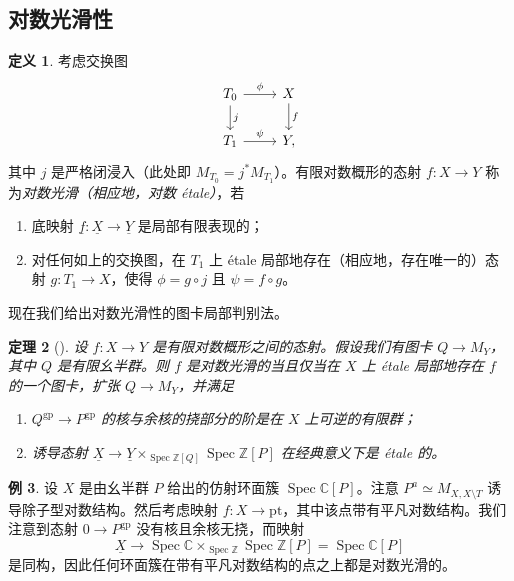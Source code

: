 \documentclass{amsart}
\newtheorem{thm}{定理}[section]
\theoremstyle{definition}
\newtheorem{defn}[thm]{定义}
\newtheorem{exm}[thm]{例}
\theoremstyle{remark}
\theoremstyle{plain}
\theoremstyle{definition}
\theoremstyle{remark}
\newcommand{\C}{\mathbb{C}}
\newcommand{\Z}{\mathbb{Z}}
\newcommand{\mr}[1]{\mathrm{#1}}
\newcommand{\ul}[1]{\underline{#1}}
\newcommand{\1}{\mathbf{1}}
\newcommand{\2}{\mathbf{2}}
\newcommand{\3}{\mathbf{3}}
\DeclareMathOperator{\Spec}{Spec}
\begin{document}
\subsection{对数光滑性}%
\label{sub:Log smoothness}

\begin{defn}
    考虑交换图
    \begin{equation*}
    \begin{tikzcd}
        T_0 \ar{r}{\phi} \ar{d}{j} & X \ar{d}{f} \\
        T_1 \ar{r}{\psi} & Y,
    \end{tikzcd}
    \end{equation*}
    其中 \(j\) 是严格闭浸入（此处即 \(M_{T_0} = j^* M_{T_1}\)）。有限对数概形的态射 \(f \colon X \to Y\) 称为\textit{对数光滑（相应地，对数 \'etale）}，若
    \begin{enumerate}
        \item 底映射 \(\ul{f} \colon \ul{X} \to \ul{Y}\) 是局部有限表现的；
        \item 对任何如上的交换图，在 \(T_1\) 上 \'etale 局部地存在（相应地，存在唯一的）态射 \(g \colon T_1 \to X\)，使得 \(\phi = g \circ j\) 且 \(\psi = f \circ g\)。
    \end{enumerate}
\end{defn}

现在我们给出对数光滑性的图卡局部判别法。

\begin{thm}[{\cite[Theorem~3.5]{Kato1989}}]
    设 \(f \colon X \to Y\) 是有限对数概形之间的态射。假设我们有图卡 \(Q \to M_Y\)，其中 \(Q\) 是有限幺半群。则 \(f\) 是对数光滑的当且仅当在 \(X\) 上 \'etale 局部地存在 \(f\) 的一个图卡，扩张 \(Q \to M_Y\)，并满足
    \begin{enumerate}
        \item \(Q^{\mr{gp}} \to P^{\mr{gp}}\) 的核与余核的挠部分的阶是在 \(X\) 上可逆的有限群；
        \item 诱导态射 \(\ul{X} \to \ul{Y} \times_{\Spec \Z[Q]} \Spec \Z[P]\) 在经典意义下是 \'etale 的。
    \end{enumerate}
\end{thm}

\begin{exm}
    设 \(X\) 是由幺半群 \(P\) 给出的仿射环面簇 \(\Spec \C[P]\)。注意 \(P^a \simeq M_{X, X \setminus T}\) 诱导除子型对数结构。然后考虑映射 \(f \colon X \to \mr{pt}\)，其中该点带有平凡对数结构。我们注意到态射 \(0 \to P^{\mr{gp}}\) 没有核且余核无挠，而映射
    \[ \ul{X} \to \Spec \C \times_{\Spec \Z} \Spec \Z[P] = \Spec \C[P] \]
    是同构，因此任何环面簇在带有平凡对数结构的点之上都是对数光滑的。
\end{exm}
\end{document}
